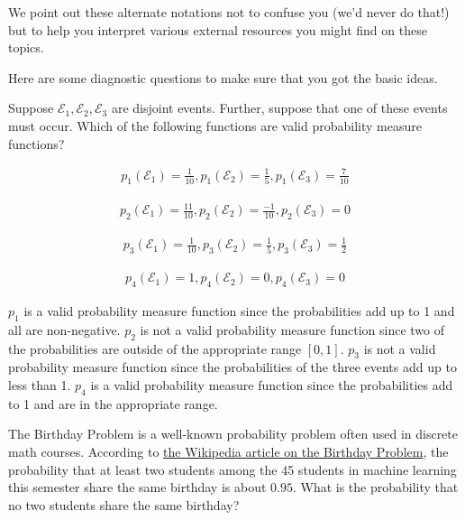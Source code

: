 \documentclass[assignment01_Solutions]{subfiles}
\begin{document}
We point out these alternate notations not to confuse you (we'd never do that!) but to help you interpret various external resources you might find on these topics.

\vspace{1em}
\begin{exercise}[(10 minutes)]
Here are some diagnostic questions to make sure that you got the basic ideas. 
\bes
\item Suppose $\mathcal{E}_1, \mathcal{E}_2, \mathcal{E}_3$ are disjoint events.  Further, suppose that one of these events must occur.  Which of the following functions are valid probability measure functions?

\begin{align}
p_1(\mathcal{E}_1)=\frac{1}{10} , p_1(\mathcal{E}_2)=\frac{1}{5}, p_1(\mathcal{E}_3)=\frac{7}{10} \nonumber
\end{align}


\begin{align}
p_2(\mathcal{E}_1)=\frac{11}{10} , p_2(\mathcal{E}_2)=\frac{-1}{10}, p_2(\mathcal{E}_3)= 0 \nonumber
\end{align}



\begin{align}
p_3(\mathcal{E}_1)=\frac{1}{10} , p_3(\mathcal{E}_2)=\frac{1}{5}, p_3(\mathcal{E}_3)=\frac{1}{2} \nonumber
\end{align}



\begin{align}
p_4(\mathcal{E}_1)=1 , p_4(\mathcal{E}_2)=0, p_4(\mathcal{E}_3)=0 \nonumber
\end{align}

\begin{boxedsolution}
$p_1$ is a valid probability measure function since the probabilities add up to 1 and all are non-negative.  $p_2$ is not a valid probability measure function since two of the probabilities are outside of the appropriate range $[0,1]$.  $p_3$ is not a valid probability measure function since the probabilities of the three events add up to less than 1. $p_4$ is a valid probability measure function since the probabilities add to 1 and are in the appropriate range.
\end{boxedsolution}

\item The Birthday Problem is a well-known probability problem often used in discrete math courses.  According to \href{https://en.wikipedia.org/wiki/Birthday_problem}{the Wikipedia article on the Birthday Problem}, the probability that at least two students among the 45 students in machine learning this semester share the same birthday is about $0.95$.  What is the probability that no two students share the same birthday?


\end{exercise}
\end{document}
